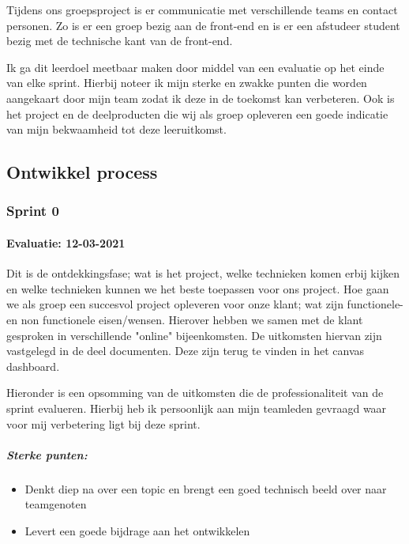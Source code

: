 	Tijdens ons groepsproject is er communicatie met verschillende teams en contact personen.
	Zo is er een groep bezig aan de front-end en is er een afstudeer student bezig met de technische kant van de front-end.


	Ik ga dit leerdoel meetbaar maken door middel van een evaluatie op het einde van elke sprint.
	Hierbij noteer ik mijn sterke en zwakke punten die worden aangekaart door mijn team zodat ik deze in de toekomst kan verbeteren.
	Ook is het project en de deelproducten die wij als groep opleveren een goede indicatie van mijn bekwaamheid tot deze leeruitkomst.

	\newpage
	\bigskip



	\subsection{Ontwikkel process}

	\subsubsection{Sprint 0}
	\paragraph{Evaluatie: 12-03-2021}
	Dit is de ontdekkingsfase; wat is het project, welke technieken komen erbij kijken
	en welke technieken kunnen we het beste toepassen voor ons project.
	Hoe gaan we als groep een succesvol project opleveren voor onze klant; wat zijn functionele- en non functionele eisen/wensen.
	Hierover hebben we samen met de klant gesproken in verschillende "online" bijeenkomsten.
	De uitkomsten hiervan zijn vastgelegd in de deel documenten. Deze zijn terug te vinden in het canvas dashboard.


	Hieronder is een opsomming van de uitkomsten die de professionaliteit van de sprint evalueren.
	Hierbij heb ik persoonlijk aan mijn teamleden gevraagd waar voor mij verbetering ligt bij deze sprint.
	\subparagraph{Sterke punten:}
	\begin{itemize}
		\setlength{\itemsep}{0pt}%
		\setlength{\parskip}{0pt}%
		\item Denkt diep na over een topic en brengt een goed technisch beeld over naar teamgenoten
		\item Levert een goede bijdrage aan het ontwikkelen
	\end{itemize}

